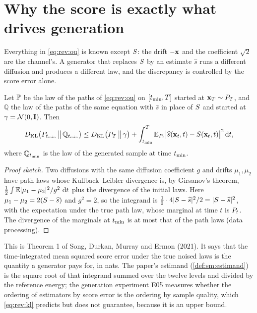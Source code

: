 \section{Why the score is exactly what drives generation}
\label{sec:rev:why}

Everything in \cref{eq:rev:ou} is known except $S$: the drift $-\mathbf{x}$ and the
coefficient $\sqrt2$ are the channel's. A generator that replaces $S$ by an
estimate $\widehat s$ runs a different diffusion and produces a different law, and the
discrepancy is controlled by the score error alone.

\begin{proposition}
\label{prop:rev:girsanov}
Let $\mathbb{P}$ be the law of the paths of \cref{eq:rev:ou} on $[t_{\min},T]$ started at
$\mathbf{x}_T\sim P_T$, and $\mathbb{Q}$ the law of the paths of the same equation with
$\widehat s$ in place of $S$ and started at $\gamma=\mathcal{N}\!\left(0,\mathbf{I}\right)$. Then
\begin{equation}
  D_{\mathrm{KL}}\bigl(P_{t_{\min}}\,\big\|\,\mathbb{Q}_{t_{\min}}\bigr)
  \le D_{\mathrm{KL}}\bigl(P_T\,\big\|\,\gamma\bigr)+\int_{t_{\min}}^{T}\mathbb{E}_{P_t}\bigl|\widehat s(\mathbf{x}_t,t)-S(\mathbf{x}_t,t)\bigr|^2\,\mathrm{d} t ,
  \label{eq:rev:kl}
\end{equation}
where $\mathbb{Q}_{t_{\min}}$ is the law of the generated sample at time $t_{\min}$.
\end{proposition}

\begin{proof}[Proof sketch]
Two diffusions with the same diffusion coefficient $g$ and drifts $\mu_1,\mu_2$ have
path laws whose Kullback--Leibler divergence is, by Girsanov's theorem,
$\tfrac12\int\mathbb{E}|\mu_1-\mu_2|^2/g^2\,\,\mathrm{d} t$ plus the divergence of the initial laws.
Here $\mu_1-\mu_2=2(S-\widehat s)$ and $g^2=2$, so the integrand is
$\tfrac12\cdot4|S-\widehat s|^2/2=|S-\widehat s|^2$, with the expectation
under the true path law, whose marginal at time $t$ is $P_t$. The divergence of the
marginals at $t_{\min}$ is at most that of the path laws (data processing).
\end{proof}

This is Theorem 1 of Song, Durkan, Murray and Ermon (2021). It says that the
time-integrated mean squared score error under the true noised laws is the quantity a
generator pays for, in nats. The paper's estimand (\cref{def:sm:estimand}) is the
square root of that integrand summed over the twelve levels and divided by the
reference energy; the generation experiment E05 measures whether the ordering of
estimators by score error is the ordering by sample quality, which
\cref{eq:rev:kl} predicts but does not guarantee, because it is an upper bound.

